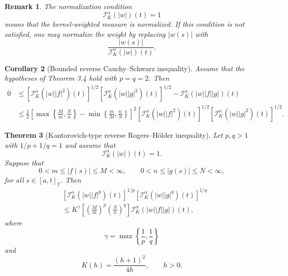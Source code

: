 \documentclass[11pt]{article}
\newtheorem{theorem}{Theorem}[section]
\newtheorem{corollary}[theorem]{Corollary}
\newtheorem{remark}[theorem]{Remark}
\begin{document}
\begin{remark}
The normalization condition
\[
    \mathcal{I}_{K}^{\alpha}(|w|)(t)=1
\]
means that the kernel-weighted measure is normalized. If this condition is not
satisfied, one may normalize the weight by replacing $|w(s)|$ with
\[
    \frac{|w(s)|}
    {\mathcal{I}_{K}^{\alpha}(|w|)(t)}.
\]
\end{remark}

\begin{corollary}[Bounded reverse Cauchy--Schwarz inequality]
Assume that the hypotheses of Theorem 3.4 hold with $p=q=2$. Then
\[
\begin{aligned}
0
&\leq
\left[
\mathcal{I}_{K}^{\alpha}(|w||f|^2)(t)
\right]^{1/2}
\left[
\mathcal{I}_{K}^{\alpha}(|w||g|^2)(t)
\right]^{1/2}
-
\mathcal{I}_{K}^{\alpha}(|w||f||g|)(t)                         \\
&\leq
\frac12
\left[
\max\left\{
\frac{M}{m},\frac{N}{n}
\right\}
-
\min\left\{
\frac{m}{M},\frac{n}{N}
\right\}
\right]^2
\left[
\mathcal{I}_{K}^{\alpha}(|w||f|^2)(t)
\right]^{1/2}
\left[
\mathcal{I}_{K}^{\alpha}(|w||g|^2)(t)
\right]^{1/2}.
\end{aligned}
\]
\end{corollary}

\begin{theorem}[Kantorovich-type reverse Rogers--H\"older inequality]
Let $p,q>1$ with $1/p+1/q=1$ and assume that
\[
    \mathcal{I}_{K}^{\alpha}(|w|)(t)=1.
\]
Suppose that
\[
    0<m\leq |f(s)|\leq M<\infty,
    \qquad
    0<n\leq |g(s)|\leq N<\infty,
\]
for all $s\in[a,t]_{\mathbb{T}}$. Then
\[
\begin{aligned}
&
\left[
\mathcal{I}_{K}^{\alpha}(|w||f|^p)(t)
\right]^{1/p}
\left[
\mathcal{I}_{K}^{\alpha}(|w||g|^q)(t)
\right]^{1/q}                                                \\
&\leq
K^{\gamma}
\left[
\left(\frac{M}{m}\right)^p
\left(\frac{N}{n}\right)^q
\right]
\mathcal{I}_{K}^{\alpha}(|w||f||g|)(t),
\end{aligned}
\]
where
\[
    \gamma=\max\left\{\frac1p,\frac1q\right\}
\]
and
\[
    K(h)=\frac{(h+1)^2}{4h},\qquad h>0.
\]
\end{theorem}
\end{document}
